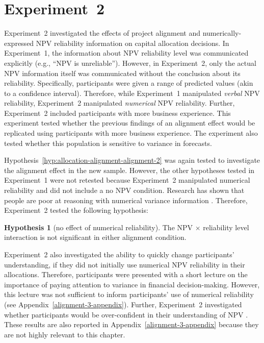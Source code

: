 \documentclass[a4paper, nobind]{templates/ociamthesis}
\theoremstyle{definition}
\theoremstyle{definition}
\theoremstyle{definition}
\theoremstyle{definition}
\newtheorem{hypothesis}{Hypothesis}[chapter]
\theoremstyle{remark}
\begin{document}
\hypertarget{alignment-3}{%
\section{Experiment~2}\label{alignment-3}}

Experiment~2 investigated the effects of project alignment and
numerically-expressed NPV reliability information on capital allocation
decisions. In Experiment~1, the information about NPV reliability level was
communicated explicitly (e.g., ``NPV is unreliable''). However, in Experiment~2,
only the actual NPV information itself was communicated without the conclusion
about its reliability. Specifically, participants were given a range of
predicted values (akin to a confidence interval). Therefore, while Experiment~1
manipulated \emph{verbal} NPV reliability, Experiment~2 manipulated \emph{numerical} NPV
reliability. Further, Experiment~2 included participants with more business
experience. This experiment tested whether the previous findings of an alignment
effect would be replicated using participants with more business experience. The
experiment also tested whether this population is sensitive to variance in
forecasts.

Hypothesis~\ref{hyp:allocation-alignment-alignment-2} was again tested to
investigate the alignment effect in the new sample. However, the other
hypotheses tested in Experiment~1 were not retested because Experiment~2
manipulated numerical reliability and did not include a no NPV condition.
Research has shown that people are poor at reasoning with numerical variance
information \autocite{galesic2010,konold1993,vivalt2021,batteux2020}. Therefore,
Experiment~2 tested the following hypothesis:

\begin{hypothesis}[no effect of numerical reliability]
\protect\hypertarget{hyp:allocation-npv-reliability-alignment-3}{}{\label{hyp:allocation-npv-reliability-alignment-3} \iffalse (no effect of numerical reliability) \fi{} }The NPV \(\times\) reliability level interaction is not significant in either
alignment condition.
\end{hypothesis}

Experiment~2 also investigated the ability to quickly change participants'
understanding, if they did not initially use numerical NPV reliability in their
allocations. Therefore, participants were presented with a short lecture on the
importance of paying attention to variance in financial decision-making.
However, this lecture was not sufficient to inform participants' use of
numerical reliability (see Appendix~\ref{alignment-3-appendix}). Further,
Experiment~2 investigated whether participants would be over-confident in their
understanding of NPV \autocite[as in][]{long2018}. These results are also reported in
Appendix~\ref{alignment-3-appendix} because they are not highly relevant to
this chapter.
\end{document}
